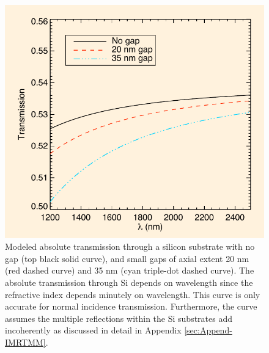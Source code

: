 \documentclass[osajnl,preprint,showpacs,superscriptaddress,12pt]{revtex4-1} %
\begin{document}
\begin{figure}[htbp]
\centerline{\includegraphics[width=0.65\columnwidth]{figs/20140421_absolute.pdf}}
\caption{Modeled absolute transmission through a silicon substrate with no gap (top black solid curve), and small gaps of axial extent 20 nm (red dashed curve) and 35 nm (cyan triple-dot dashed curve)\label{figAbsoluteTrans}.  The absolute transmission through Si depends on wavelength since the refractive index depends minutely on wavelength.  This curve is only accurate for normal incidence transmission.  Furthermore, the curve assumes the multiple reflections within the Si substrates add incoherently as discussed in detail in Appendix \ref{sec:Append-IMRTMM}.}
\end{figure}
\end{document}
